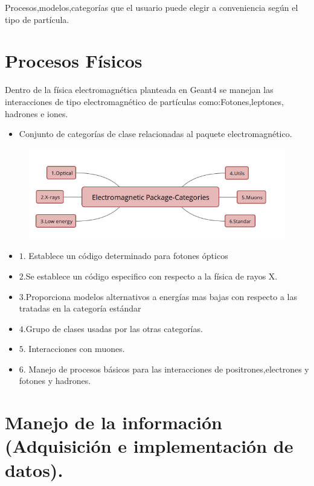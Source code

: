 \documentclass[12pt,fleqn]{book} %
\numberwithin{equation}{section} %
\numberwithin{figure}{section} %
\numberwithin{table}{section} %
\begin{document}
{ Procesos,modelos,categorías que el usuario puede elegir a conveniencia según el tipo de partícula.  

\section{Procesos Físicos}

Dentro de la física electromagnética planteada en Geant4 se manejan las  interacciones de tipo electromagnético de partículas como:Fotones,leptones, hadrones e iones.

\begin{itemize}
 \item Conjunto de categorías de clase relacionadas al paquete electromagnético.  
\end{itemize}

\begin{figure}[h]
\centering
  \includegraphics[scale=0.7]{packa}
  \end{figure}
  
\begin{itemize}
\item$1.$ Establece un código determinado para fotones ópticos
\item$2.$Se establece un código especifico con respecto a la
física de rayos X.
\item$3.$Proporciona modelos alternativos a energías mas bajas con respecto a las tratadas en la categoría estándar
\item$4.$Grupo de clases usadas por las otras categorías.
\item$5.$ Interacciones con muones.
\item$6.$ Manejo de procesos básicos para las interacciones de  positrones,electrones y fotones y hadrones.
\end{itemize}
  

\section{Manejo de la información (Adquisición e implementación de datos).}



}
\end{document}
